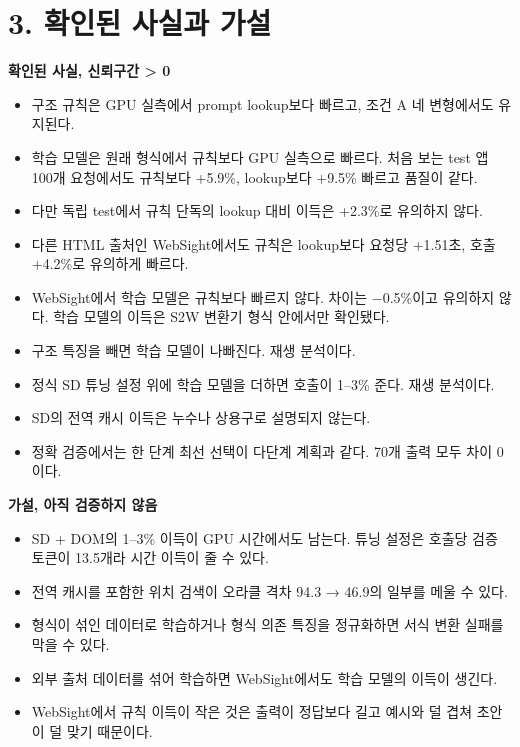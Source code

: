 \documentclass[10pt,a4paper]{article}
\begin{document}
\section*{3. 확인된 사실과 가설}
\textbf{확인된 사실, 신뢰구간 > 0}
\begin{itemize}[leftmargin=1.2em]
\item 구조 규칙은 GPU 실측에서 prompt lookup보다 빠르고, 조건 A 네 변형에서도 유지된다.
\item 학습 모델은 원래 형식에서 규칙보다 GPU 실측으로 빠르다. 처음 보는 test 앱 100개 요청에서도 규칙보다 +5.9\%, lookup보다 +9.5\% 빠르고 품질이 같다.
\item 다만 독립 test에서 규칙 단독의 lookup 대비 이득은 +2.3\%로 유의하지 않다.
\item 다른 HTML 출처인 WebSight에서도 규칙은 lookup보다 요청당 +1.51초, 호출 +4.2\%로 유의하게 빠르다.
\item WebSight에서 학습 모델은 규칙보다 빠르지 않다. 차이는 −0.5\%이고 유의하지 않다. 학습 모델의 이득은 S2W 변환기 형식 안에서만 확인됐다.
\item 구조 특징을 빼면 학습 모델이 나빠진다. 재생 분석이다.
\item 정식 SD 튜닝 설정 위에 학습 모델을 더하면 호출이 1--3\% 준다. 재생 분석이다.
\item SD의 전역 캐시 이득은 누수나 상용구로 설명되지 않는다.
\item 정확 검증에서는 한 단계 최선 선택이 다단계 계획과 같다. 70개 출력 모두 차이 0이다.
\end{itemize}
\textbf{가설, 아직 검증하지 않음}
\begin{itemize}[leftmargin=1.2em]
\item SD + DOM의 1--3\% 이득이 GPU 시간에서도 남는다. 튜닝 설정은 호출당 검증 토큰이 13.5개라 시간 이득이 줄 수 있다.
\item 전역 캐시를 포함한 위치 검색이 오라클 격차 94.3 → 46.9의 일부를 메울 수 있다.
\item 형식이 섞인 데이터로 학습하거나 형식 의존 특징을 정규화하면 서식 변환 실패를 막을 수 있다.
\item 외부 출처 데이터를 섞어 학습하면 WebSight에서도 학습 모델의 이득이 생긴다.
\item WebSight에서 규칙 이득이 작은 것은 출력이 정답보다 길고 예시와 덜 겹쳐 초안이 덜 맞기 때문이다.
\end{itemize}
\end{document}
